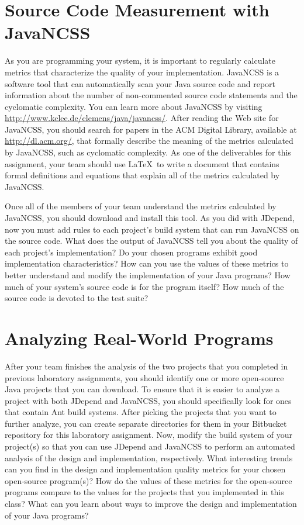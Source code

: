 \section*{Source Code Measurement with JavaNCSS}

As you are programming your system, it is important to regularly calculate metrics that characterize the quality of
your implementation.  JavaNCSS is a software tool that can automatically scan your Java source code and report
information about the number of non-commented source code statements and the cyclomatic complexity.  You can learn more
about JavaNCSS by visiting \url{http://www.kclee.de/clemens/java/javancss/}. After reading the Web site for JavaNCSS,
you should search for papers in the ACM Digital Library, available at \url{http://dl.acm.org/}, that formally describe
the meaning of the metrics calculated by JavaNCSS, such as cyclomatic complexity. As one of the deliverables for this
assignment, your team should use \LaTeX\ to write a document that contains formal definitions and equations that explain
all of the metrics calculated by JavaNCSS.  

Once all of the members of your team understand the metrics calculated by JavaNCSS, you should download and install
this tool.  As you did with JDepend, now you must add rules to each project's build system that can run JavaNCSS on the
source code. What does the output of JavaNCSS tell you about the quality of each project's implementation? Do your
chosen programs exhibit good implementation characteristics? How can you use the values of these metrics to better
understand and modify the implementation of your Java programs? How much of your system's source code is for the
program itself? How much of the source code is devoted to the test suite?

\section*{Analyzing Real-World Programs}

After your team finishes the analysis of the two projects that you completed in previous laboratory assignments, you
should identify one or more open-source Java projects that you can download.  To ensure that it is easier to analyze a
project with both JDepend and JavaNCSS, you should specifically look for ones that contain Ant build systems. After
picking the projects that you want to further analyze, you can create separate directories for them in your Bitbucket
repository for this laboratory assignment.  Now, modify the build system of your project(s) so that you can use JDepend
and JavaNCSS to perform an automated analysis of the design and implementation, respectively.  What interesting trends
can you find in the design and implementation quality metrics for your chosen open-source program(s)?  How do the values
of these metrics for the open-source programs compare to the values for the projects that you implemented in this class?
What can you learn about ways to improve the design and implementation of your Java programs?

